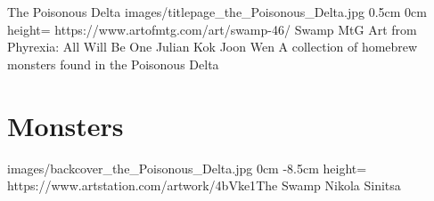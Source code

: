 \documentclass[letterpaper,openany,twoside,twocolumn]{book}
\begin{document}
	\bookTitlePage
		{The Poisonous Delta}
		{images/titlepage_the_Poisonous_Delta.jpg}
		{0.5cm}
		{0cm}
		{height=\paperheight}
		{https://www.artofmtg.com/art/swamp-46/}
		{Swamp MtG Art from Phyrexia: All Will Be One}
		{Julian Kok Joon Wen}
		{A collection of homebrew monsters found in the Poisonous Delta}
	
	\tableofcontents
	
	\mainmatter
	
	\MonsterSheetGeometry
	\part{Monsters}
	
	
	
	
	\renewcommand{\ThanksSpacing}{1cm}
	\bookLastPage
		{images/backcover_the_Poisonous_Delta.jpg}
		{0cm}
		{-8.5cm}
		{height=\paperheight}
		{https://www.artstation.com/artwork/4bVke1}{The Swamp}
		{Nikola Sinitsa}
		{}
\end{document}
